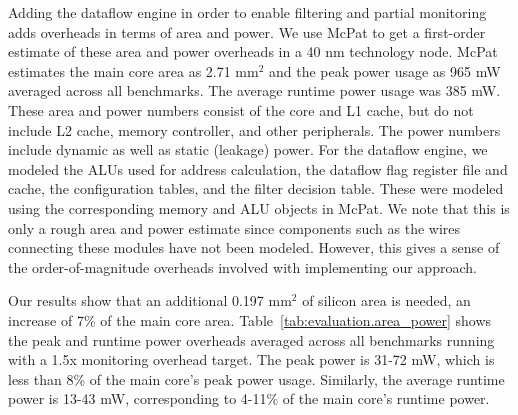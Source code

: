Adding the dataflow engine in order to enable filtering and partial monitoring adds
overheads in terms of area and power. We use McPat \cite{mcpat-micro09} to get
a first-order estimate of these area and power overheads in a 40 nm technology
node. McPat estimates the main core area as 2.71 mm$^2$ and the peak power usage as
965 mW averaged across all benchmarks. The average runtime power usage was 385 
mW. These area and power numbers consist of the core and
L1 cache, but do not include L2 cache, memory controller, and other
peripherals. The power numbers include dynamic as well as static (leakage)
power. For the dataflow engine, we modeled the ALUs used for address
calculation, the dataflow flag register file and cache, the configuration
tables, and the filter decision table. These were modeled using the
corresponding memory and ALU objects in McPat. We
note that this is only a rough area and power estimate since components such as the
wires connecting these modules have not been modeled. However, this gives a
sense of the order-of-magnitude overheads involved with implementing our
approach.

Our results show that an additional 0.197 mm$^2$ of silicon area is needed, an
increase of 7\% of the main core area. Table~\ref{tab:evaluation.area_power}
shows the peak and runtime power overheads averaged across all benchmarks running with
a 1.5x monitoring overhead target. The peak power is 31-72 mW, which is
less than 8\% of the main core's peak power usage. Similarly, the average runtime power is 13-43
mW, corresponding to 4-11\% of the main core's runtime power.


